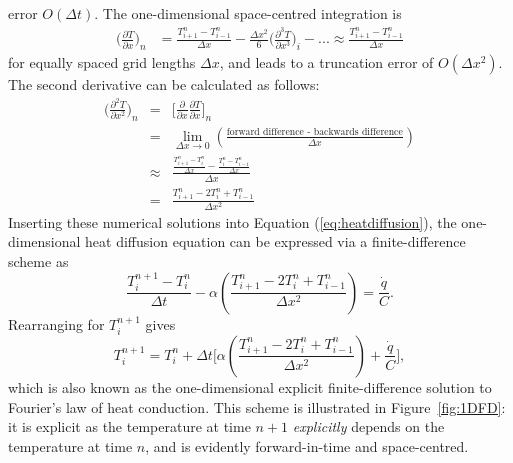 error $O(\Delta t)$. The one-dimensional space-centred integration
is
\begin{align}
\bigg(\frac{\partial T}{\partial x}\bigg)_n &= \frac{T_{i+1}^{n} - T_{i-1}^{n}}{\Delta x} - \frac{\Delta x^2}{6}\bigg(\frac{\partial^3 T}{\partial x^3}\bigg)_i - ... \approx \frac{T_{i+1}^{n} - T_{i-1}^{n}}{\Delta x}
\end{align}
for equally spaced grid lengths $\Delta x$, and leads to a truncation
error of $O(\Delta x^2)$. The second derivative can be calculated
as follows:
\begin{eqnarray}
\bigg(\frac{\partial^2 T}{\partial x^2}\bigg)_n &=& \bigg[ \frac{\partial}{\partial x} \frac{\partial T}{\partial x}\bigg]_n \nonumber \\
                                                                      &=& \lim\limits_{\Delta x \to 0} \left(\frac{\text{forward difference - backwards difference}}{\Delta x}\right) \nonumber \\
                                                                      &\approx& \frac{\frac{T_{i+1}^{n} - T_{i}^n}{\Delta x} - \frac{T_{i}^{n} - T_{i-1}^{n}}{\Delta x} }{\Delta x} \nonumber \\
                                                                      &=& \frac{T_{i+1}^{n} - 2T_{i}^n + T_{i-1}^{n}}{\Delta x^2}
\end{eqnarray}
Inserting these numerical solutions into Equation (\ref{eq:heatdiffusion}),
the one-dimensional heat diffusion equation can be expressed via a
finite-difference scheme
 as
\begin{equation}
\frac{T_{i}^{n+1} - T_{i}^n}{\Delta t} - \alpha \left(\frac{T_{i+1}^{n} - 2T_{i}^n + T_{i-1}^{n}}{\Delta x^2}\right) = \frac{\dot{q}}{C}.
\end{equation}
Rearranging for $T_{i}^{n+1} $ gives
\begin{equation}
T_{i}^{n+1}  = T_{i}^n + \Delta t \bigg[  \alpha \left(\frac{T_{i+1}^{n} - 2T_{i}^n + T_{i-1}^n}{\Delta x^2}\right) + \frac{\dot{q}}{C}  \bigg],
\end{equation}
which is also known as the one-dimensional explicit finite-difference
solution to Fourier's law of heat conduction. This scheme is illustrated
in Figure~\ref{fig:1DFD}: it is explicit as the temperature at time $n+1$
{\em explicitly} depends on the temperature at time $n$, and is evidently
forward-in-time and space-centred.

